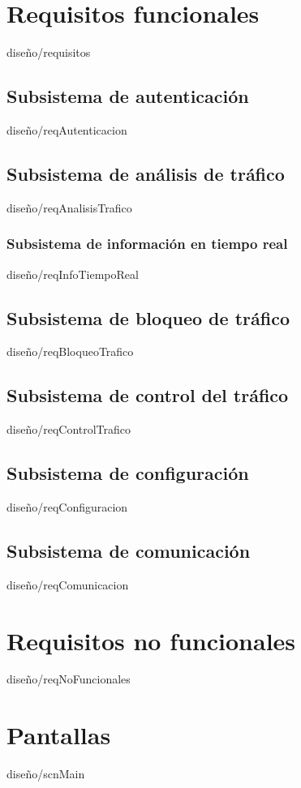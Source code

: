 \documentclass[epsbased,copyright,final,printable,covers,extendedindex,firstnumbered,tfg,gnuplot]{tfgtfmthesisuam}
\begin{document}
        

    \section{Requisitos funcionales\label{SEC:requisitos}}{diseño/requisitos}
        \subsection{Subsistema de autenticación\label{SEC:reqAutenticacion}}{diseño/reqAutenticacion}
        \subsection{Subsistema de análisis de tráfico\label{SEC:reqAnalisisTrafico}}{diseño/reqAnalisisTrafico}
            \subsubsection{Subsistema de información en tiempo real\label{SEC:reqInfoTiempoReal}}{diseño/reqInfoTiempoReal}
        \subsection{Subsistema de bloqueo de tráfico\label{SEC:reqBloqueoTrafico}}{diseño/reqBloqueoTrafico}
        \subsection{Subsistema de control del tráfico\label{SEC:reqControlTrafico}}{diseño/reqControlTrafico}
        \subsection{Subsistema de configuración\label{SEC:reqConfiguracion}}{diseño/reqConfiguracion}
        \subsection{Subsistema de comunicación\label{SEC:reqComunicacion}}{diseño/reqComunicacion}
        
    \section{Requisitos no funcionales\label{SEC:reqNoFuncionales}}{diseño/reqNoFuncionales}

    \section{Pantallas\label{SEC:scnMain}}{diseño/scnMain}
\end{document}
